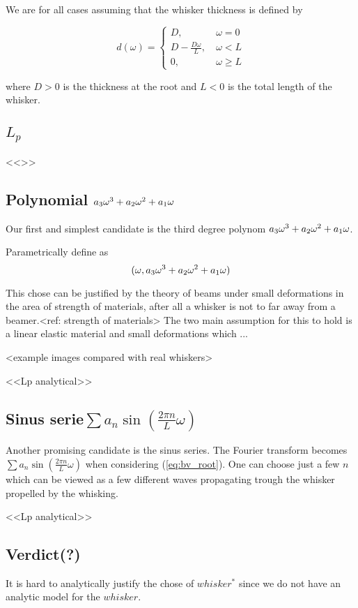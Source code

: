 We are for all cases assuming that the whisker thickness is defined by

\begin{equation}
    d(\omega) = \begin{cases}
        D,~& \omega=0\\
        D-\frac{D\omega}{L},~& \omega<L\\
        0,~& \omega\ge L
    \end{cases}
\end{equation}

where $D>0$ is the thickness at the root and $L<0$ is the total length of the
whisker.


\subsection{$L_p$}
    <<>>

\subsection{Polynomial $a_3\omega^3+a_2\omega^2+a_1\omega$}

    Our first and simplest candidate is the third degree polynom $a_3\omega^3+a_2\omega^2+a_1\omega$.

    Parametrically define as
    \begin{equation}
        (\omega,a_3\omega^3+a_2\omega^2+a_1\omega)
    \end{equation}

    This chose can be justified by the theory of beams under small deformations 
    in the area of strength of materials, after all a whisker is not to far 
    away from a beamer.<ref: strength of materials> The two main assumption
    for this to hold is a linear elastic material and small deformations which
    ...

    <example images compared with real whiskers>

    <<Lp analytical>>

\subsection{Sinus serie$\sum{a_n\sin (\frac{2\pi n}{L}\omega)}$}
    Another promising candidate is the sinus series.
    The Fourier transform becomes $\sum{a_n\sin (\frac{2\pi n}{L}\omega)}$ when
    considering (\ref{eq:bv_root}). One can choose just a few $n$ which can be
    viewed as a few different waves propagating trough the whisker propelled by
    the whisking. 

    <<Lp analytical>>

\subsection{Verdict(?)}
    It is hard to analytically justify the chose of $whisker^*$ since we do not
    have an analytic model for the $whisker$.




